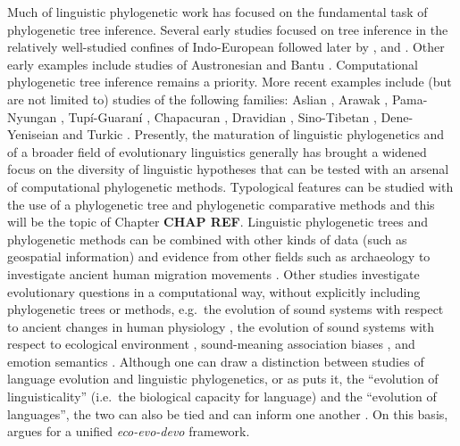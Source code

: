 Much of linguistic phylogenetic work has focused on the fundamental task of phylogenetic tree inference. Several early studies focused on tree inference in the relatively well-studied confines of Indo-European \autocites{gray_language-tree_2003}{atkinson_words_2005}{nicholls_dated_2008} followed later by \textcite{ryder_missing_2011}, \textcite{bouckaert_mapping_2012} and \textcite{chang_ancestry-constrained_2015}. Other early examples include studies of Austronesian \autocite{gray_language_2000} and Bantu \autocites{holden_bantu_2002}{holden_rapid_2006}. Computational phylogenetic tree inference remains a priority. More recent examples include (but are not limited to) studies of the following families: Aslian \autocite{dunn_aslian_2011}, Arawak \autocite{walker_bayesian_2011}, Pama-Nyungan \autocites{bowern_computational_2012}{bouckaert_origin_2018}, Tupí-Guaraní \autocite{michael_bayesian_2015}, Chapacuran \autocite{birchall_combined_2016}, Dravidian \autocite{kolipakam_bayesian_2018}, Sino-Tibetan \autocite{sagart_dated_2019}, Dene-Yeniseian \autocites{sicoli_linguistic_2014}[but c.f.][]{yanovich_phylogenetic_2020} and Turkic \autocite{savelyev_bayesian_2020}. Presently, the maturation of linguistic phylogenetics and of a broader field of evolutionary linguistics generally \autocites{dediu_language_2016}{nolle_language_2020} has brought a widened focus on the diversity of linguistic hypotheses that can be tested with an arsenal of computational phylogenetic methods. Typological features can be studied with the use of a phylogenetic tree and phylogenetic comparative methods \autocite[e.g.][]{dunn_evolved_2011} and this will be the topic of Chapter \textbf{CHAP REF}. Linguistic phylogenetic trees and phylogenetic methods can be combined with other kinds of data (such as geospatial information) and evidence from other fields such as archaeology to investigate ancient human migration movements \autocites[e.g.][]{gray_language_2009}{bouckaert_mapping_2012}{bouckaert_origin_2018}. Other studies investigate evolutionary questions in a computational way, without explicitly including phylogenetic trees or methods, e.g.~the evolution of sound systems with respect to ancient changes in human physiology \autocite{blasi_human_2019}, the evolution of sound systems with respect to ecological environment \autocite{everett_climate_2015}, sound-meaning association biases \autocite{blasi_soundmeaning_2016}, and emotion semantics \autocite{jackson_emotion_2019}. Although one can draw a distinction between studies of language evolution and linguistic phylogenetics, or as \textcite{haspelmath_human_2020} puts it, the ``evolution of linguisticality'' (i.e.~the biological capacity for language) and the ``evolution of languages'', the two can also be tied and can inform one another \autocites{blasi_soundmeaning_2016}{nolle_language_2020}. On this basis, \textcite{segovia-martin_eco-evo-devo_2020} argues for a unified \emph{eco-evo-devo} framework.

